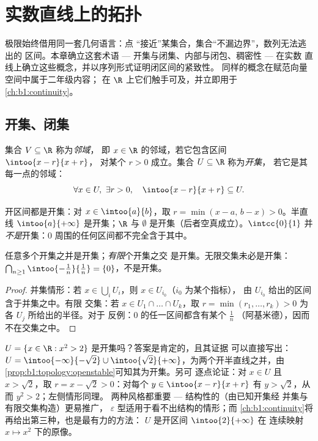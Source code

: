 \chapter{实数直线上的拓扑}\label{ch:b1:topology}

极限始终借用同一套几何语言：点
“接近”某集合，集合“不漏边界”，数列无法逃出的
区间。本章确立这套术语 ---
开集与闭集、内部与闭包、稠密性 --- 在实数
直线上确立这些概念，并以序列形式证明闭区间的紧致性。
同样的概念在赋范向量空间中属于二年级内容；
在 $\R$ 上它们触手可及，并立即用于
\cref{ch:b1:continuity}。

\section{开集、闭集}

\begin{definition}[邻域、开集]\label{def:b1:topology:open}
集合 $V \subseteq \R$ 称为\emph{邻域}，
即 $x \in \R$ 的邻域，若它包含区间 $\intoo{x - r}{x + r}$，
对某个 $r > 0$ 成立。集合 $U \subseteq \R$ 称为\emph{开集}，
若它是其每一点的邻域：
\[
\forall x \in U,\ \exists r > 0, \quad \intoo{x - r}{x + r}
\subseteq U .
\]
\end{definition}

\begin{example}\label{ex:b1:topology:open}
开区间都是开集：对 $x \in \intoo{a}{b}$，取 $r = \min(x -
a,\, b - x) > 0$。半直线 $\intoo{a}{+\infty}$ 是开集；$\R$ 与
$\emptyset$ 是开集（后者空真成立）。$\intcc{0}{1}$ 并
\emph{不是}开集：$0$ 周围的任何区间都不完全含于其中。
\end{example}

\begin{proposition}[开集的稳定性]\label{prop:b1:topology:openstable}
任意多个开集之并是开集；\emph{有限}个开集之交
是开集。无限交集未必是开集：
$\bigcap_{n \geq 1} \intoo{-\frac 1n}{\frac 1n} = \{0\}$，不是开集。
\end{proposition}

\begin{proof}
并集情形：若 $x \in \bigcup_i U_i$，则 $x \in U_{i_0}$（$i_0$ 为某个指标），
由 $U_{i_0}$ 给出的区间含于并集之中。有限
交集：若 $x \in U_1 \cap \dots \cap U_k$，取 $r = \min(r_1,
\dots, r_k) > 0$ 为各 $U_j$ 所给出的半径。对于
反例：$0$ 的任一区间都含有某个 $\frac{1}{n}$
（阿基米德），因而不在交集之中。
\end{proof}

\begin{example}[用显式半径验证开性]\label{ex:b1:topology:radii}
$U = \{x \in \R : x^2 > 2\}$ 是开集吗？答案是肯定的，且其证据
可以直接写出：$U = \intoo{-\infty}{-\sqrt2} \cup
\intoo{\sqrt2}{+\infty}$，为两个开半直线之并，由
\cref{prop:b1:topology:openstable}可知其为开集。另可
逐点论证：对 $x \in U$ 且 $x > \sqrt 2$，取 $r = x -
\sqrt2 > 0$：对每个 $y \in \intoo{x - r}{x + r}$ 有 $y >
\sqrt 2$，从而 $y^2 > 2$；左侧情形同理。
两种风格都重要 --- 结构性的（由已知开集经
并集与有限交集构造）更易推广，
$\varepsilon$ 型适用于看不出结构的情形；而
\cref{ch:b1:continuity}将再给出第三种，也是最有力的方法：
$U$ 是开区间 $\intoo{2}{+\infty}$ 在
连续映射 $x \mapsto x^2$ 下的原像。
\end{example}

